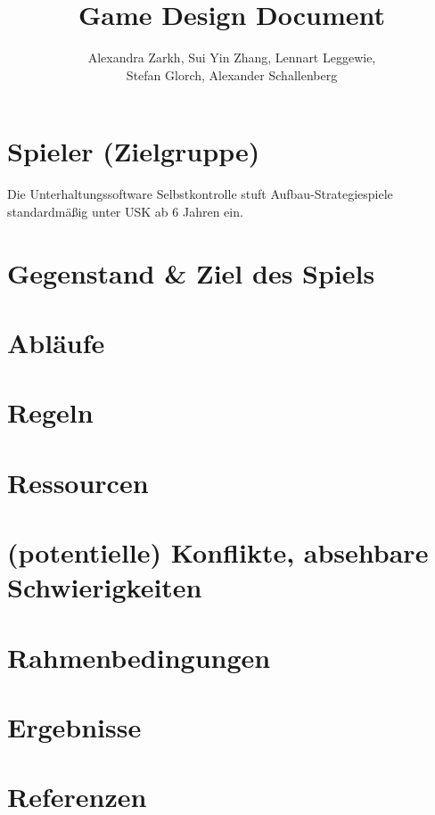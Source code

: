 \documentclass[paper=A4,pagesize=auto,12pt,headinclude=true,footinclude=true,BCOR=0mm,DIV=calc]{scrartcl}
\title{Game Design Document}
\author{Alexandra Zarkh, Sui Yin Zhang, Lennart Leggewie,\\ Stefan Glorch, Alexander Schallenberg}
\newcommand{\sectionspace}{
	\vspace{0.5cm}
}
\begin{document}
	
\begin{titlepage}
	\maketitle
\end{titlepage}


\tableofcontents
\newpage

\section{Spieler (Zielgruppe)}\label{sec:Spieler}
Die Unterhaltungssoftware Selbstkontrolle stuft Aufbau-Strategiespiele standardmäßig unter USK ab 6 Jahren \cite{usk_6} ein.

\sectionspace
\section{Gegenstand \& Ziel des Spiels}\label{sec:Gegenstand}

\sectionspace
\section{Abläufe}\label{sec:Ablaeufe}

\sectionspace
\section{Regeln}\label{sec:Regeln}

\sectionspace
\section{Ressourcen}\label{sec:Ressourcen}

\sectionspace
\section{(potentielle) Konflikte, absehbare Schwierigkeiten}\label{sec:Konflikte}

\sectionspace
\section{Rahmenbedingungen}\label{sec:Rahmenbedingungen}

\sectionspace
\section{Ergebnisse}\label{sec:Ergebnisse}

\sectionspace
\section{Referenzen}\label{sec:Referenzen}

\newpage
\printbibliography[heading=bibnumbered]
\end{document}
